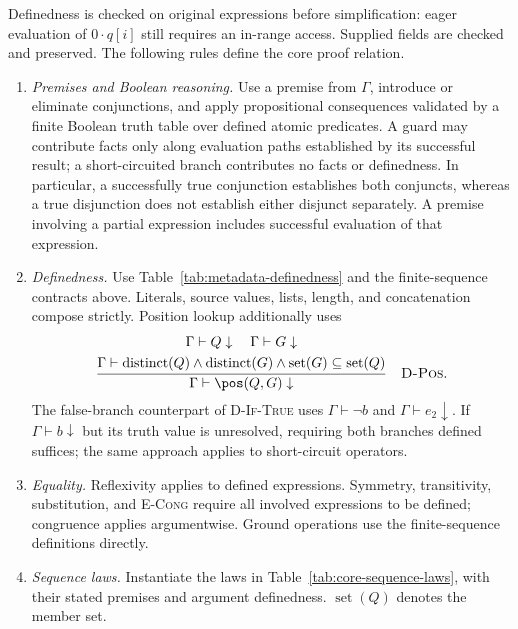 Definedness is checked on original expressions before simplification:
eager evaluation of $0\cdot q[i]$ still requires an in-range access.
Supplied fields are checked and preserved. The following rules define
the core proof relation.
\begin{enumerate}
\item \emph{Premises and Boolean reasoning.} Use a premise from $\Gamma$,
introduce or eliminate conjunctions, and apply propositional consequences
validated by a finite Boolean truth table over defined atomic predicates.
A guard may contribute facts only along evaluation paths established by
its successful result; a short-circuited branch contributes no facts or
definedness. In particular, a successfully true conjunction establishes
both conjuncts, whereas a true disjunction does not establish either
disjunct separately. A premise involving a partial expression includes
successful evaluation of that expression.
\item \emph{Definedness.} Use Table~\ref{tab:metadata-definedness} and the
finite-sequence contracts above. Literals, source values, lists, length,
and concatenation compose strictly. Position lookup additionally uses
\begin{equation*}
 \frac{\begin{gathered}
       \Gamma\vdash Q\downarrow\quad\Gamma\vdash G\downarrow\\
       \Gamma\vdash\operatorname{distinct}(Q)\land
                    \operatorname{distinct}(G)\land
                    \operatorname{set}(G)\subseteq\operatorname{set}(Q)
       \end{gathered}}
      {\Gamma\vdash\pos(Q,G)\downarrow}
 \quad\text{\textsc{D-Pos}}.
\end{equation*}
The false-branch counterpart of \textsc{D-If-True} uses
$\Gamma\vdash\neg b$ and $\Gamma\vdash e_2\downarrow$.
If $\Gamma\vdash b\downarrow$ but its truth value is unresolved, requiring
both branches defined suffices; the same approach applies to short-circuit
operators.
\item \emph{Equality.} Reflexivity applies to defined expressions.
Symmetry, transitivity, substitution, and \textsc{E-Cong} require all
involved expressions to be defined; congruence applies argumentwise.
Ground operations use the finite-sequence definitions directly.
\item \emph{Sequence laws.} Instantiate the laws in
Table~\ref{tab:core-sequence-laws}, with their stated premises and
argument definedness. $\operatorname{set}(Q)$ denotes the member set.

\end{enumerate}
